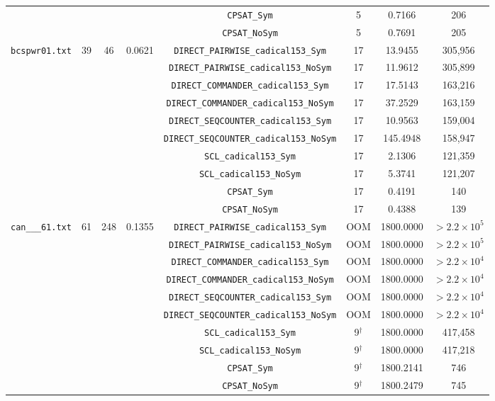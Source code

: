 \documentclass[a4paper,fleqn]{cas-sc}
\begin{document}
\begin{table}[pos=p]
\begin{tabular}{lccccccc}
 & & & & \texttt{CPSAT\_Sym} & 5 & 0.7166 & 206 \\
 & & & & \texttt{CPSAT\_NoSym} & 5 & 0.7691 & 205 \\
\midrule
\texttt{bcspwr01.txt} & 39 & 46 & 0.0621 & \texttt{DIRECT\_PAIRWISE\_cadical153\_Sym} & 17 & 13.9455 & 305,956 \\
 & & & & \texttt{DIRECT\_PAIRWISE\_cadical153\_NoSym} & 17 & 11.9612 & 305,899 \\
 & & & & \texttt{DIRECT\_COMMANDER\_cadical153\_Sym} & 17 & 17.5143 & 163,216 \\
 & & & & \texttt{DIRECT\_COMMANDER\_cadical153\_NoSym} & 17 & 37.2529 & 163,159 \\
 & & & & \texttt{DIRECT\_SEQCOUNTER\_cadical153\_Sym} & 17 & 10.9563 & 159,004 \\
 & & & & \texttt{DIRECT\_SEQCOUNTER\_cadical153\_NoSym} & 17 & 145.4948 & 158,947 \\
 & & & & \texttt{SCL\_cadical153\_Sym} & 17 & 2.1306 & 121,359 \\
 & & & & \texttt{SCL\_cadical153\_NoSym} & 17 & 5.3741 & 121,207 \\
 & & & & \texttt{CPSAT\_Sym} & 17 & 0.4191 & 140 \\
 & & & & \texttt{CPSAT\_NoSym} & 17 & 0.4388 & 139 \\
\midrule
\texttt{can\_\_\_61.txt} & 61 & 248 & 0.1355 & \texttt{DIRECT\_PAIRWISE\_cadical153\_Sym} & OOM & 1800.0000 & $> 2.2 \times 10^5$ \\
 & & & & \texttt{DIRECT\_PAIRWISE\_cadical153\_NoSym} & OOM & 1800.0000 & $> 2.2 \times 10^5$ \\
 & & & & \texttt{DIRECT\_COMMANDER\_cadical153\_Sym} & OOM & 1800.0000 & $> 2.2 \times 10^4$ \\
 & & & & \texttt{DIRECT\_COMMANDER\_cadical153\_NoSym} & OOM & 1800.0000 & $> 2.2 \times 10^4$ \\
 & & & & \texttt{DIRECT\_SEQCOUNTER\_cadical153\_Sym} & OOM & 1800.0000 & $> 2.2 \times 10^4$ \\
 & & & & \texttt{DIRECT\_SEQCOUNTER\_cadical153\_NoSym} & OOM & 1800.0000 & $> 2.2 \times 10^4$ \\
 & & & & \texttt{SCL\_cadical153\_Sym} & 9$^\dagger$ & 1800.0000 & 417,458 \\
 & & & & \texttt{SCL\_cadical153\_NoSym} & 9$^\dagger$ & 1800.0000 & 417,218 \\
 & & & & \texttt{CPSAT\_Sym} & 9$^\dagger$ & 1800.2141 & 746 \\
 & & & & \texttt{CPSAT\_NoSym} & 9$^\dagger$ & 1800.2479 & 745 \\

\end{tabular}
\end{table}
\end{document}

